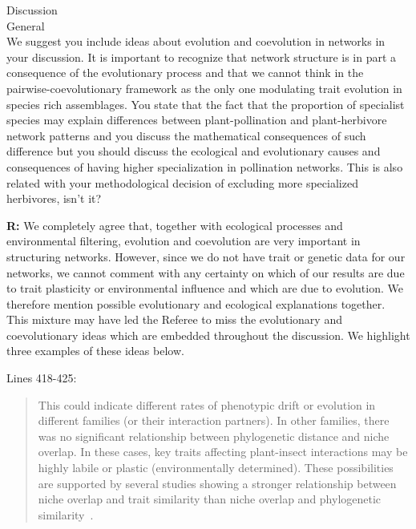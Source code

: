 \documentclass[12pt]{letter}
\newenvironment{refquote}{\bigskip \begin{it}}{\end{it}\smallskip}
\begin{document}
		\begin{refquote}
			Discussion\\
			General\\
			We suggest you include ideas about evolution and coevolution in networks in your discussion. It is important to recognize that network structure is in part a consequence of the evolutionary process and that we cannot think in the pairwise-coevolutionary framework as the only one modulating trait evolution in species rich assemblages.
			You state that the fact that the proportion of specialist species may explain differences between plant-pollination and plant-herbivore network patterns and you discuss the mathematical consequences of such difference but you should discuss the ecological and evolutionary causes and consequences of having higher specialization in pollination networks. This is also related with your methodological decision of excluding more specialized herbivores, isn't it?
		\end{refquote}


		\textbf{R:} We completely agree that, together with ecological processes and environmental filtering, evolution and coevolution are very important in structuring networks. However, since we do not have trait or genetic data for our networks, we cannot comment with any certainty on which of our results are due to trait plasticity or environmental influence and which are due to evolution. We therefore mention possible evolutionary and ecological explanations together. This mixture may have led the Referee to miss the evolutionary and coevolutionary ideas which are embedded throughout the discussion. We highlight three  examples of these ideas below.


		Lines 418-425:

		\begin{quotation}

			This could indicate different 
			rates of phenotypic drift or evolution in different families (or their interaction partners). 
			In other families, there was no significant relationship between phylogenetic
			distance and niche overlap. In these cases, key traits affecting 
			plant-insect interactions may be highly labile or plastic (environmentally determined). These possibilities are supported by several studies showing a stronger relationship between niche overlap and trait similarity than niche overlap and phylogenetic similarity~\citep{Junker2015,Ibanez2016,Endara2017}. 

		\end{quotation}
\end{document}
